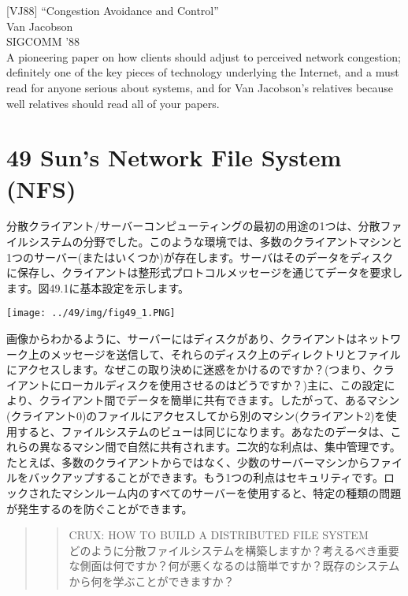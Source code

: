 {[}VJ88{]} ``Congestion Avoidance and Control''\\
Van Jacobson\\
SIGCOMM '88\\
A pioneering paper on how clients should adjust to perceived network
congestion; definitely one of the key pieces of technology underlying
the Internet, and a must read for anyone serious about systems, and for
Van Jacobson's relatives because well relatives should read all of your
papers.

\newpage

\hypertarget{suns-network-file-system-nfs}{%
\section*{49 Sun's Network File System
(NFS)}\label{suns-network-file-system-nfs}}

分散クライアント/サーバーコンピューティングの最初の用途の1つは、分散ファイルシステムの分野でした。このような環境では、多数のクライアントマシンと1つのサーバー(またはいくつか)が存在します。サーバはそのデータをディスクに保存し、クライアントは整形式プロトコルメッセージを通じてデータを要求します。図49.1に基本設定を示します。

\texttt{[image: ../49/img/fig49\_1.PNG]}

画像からわかるように、サーバーにはディスクがあり、クライアントはネットワーク上のメッセージを送信して、それらのディスク上のディレクトリとファイルにアクセスします。なぜこの取り決めに迷惑をかけるのですか？(つまり、クライアントにローカルディスクを使用させるのはどうですか？)主に、この設定により、クライアント間でデータを簡単に共有できます。したがって、あるマシン(クライアント0)のファイルにアクセスしてから別のマシン(クライアント2)を使用すると、ファイルシステムのビューは同じになります。あなたのデータは、これらの異なるマシン間で自然に共有されます。二次的な利点は、集中管理です。たとえば、多数のクライアントからではなく、少数のサーバーマシンからファイルをバックアップすることができます。もう1つの利点はセキュリティです。ロックされたマシンルーム内のすべてのサーバーを使用すると、特定の種類の問題が発生するのを防ぐことができます。

\begin{quote}
\begin{quote}
CRUX: HOW TO BUILD A DISTRIBUTED FILE SYSTEM\\
どのように分散ファイルシステムを構築しますか？考えるべき重要な側面は何ですか？何が悪くなるのは簡単ですか？既存のシステムから何を学ぶことができますか？
\end{quote}
\end{quote}

